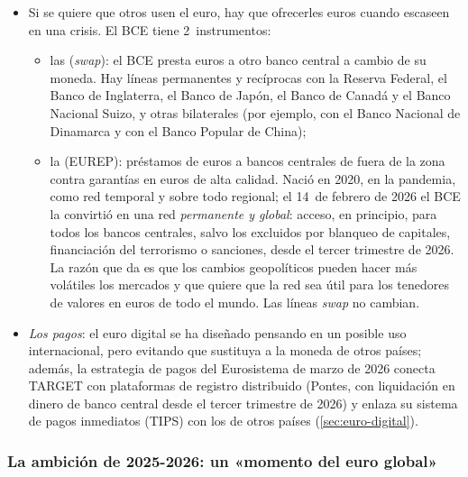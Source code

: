 \documentclass[11pt]{article}
\begin{document}
\begin{itemize}
\item Si se quiere que otros usen el euro, hay que ofrecerles euros cuando escaseen en una crisis. El BCE tiene 2~instrumentos\nocite{BCE2026LineasLiquidez}:
  \begin{itemize}
  \item las  (\emph{swap}): el BCE presta euros a otro banco central a cambio de su moneda. Hay líneas permanentes y recíprocas con la Reserva Federal, el Banco de Inglaterra, el Banco de Japón, el Banco de Canadá y el Banco Nacional Suizo, y otras bilaterales (por ejemplo, con el Banco Nacional de Dinamarca y con el Banco Popular de China);
  \item la  (EUREP): préstamos de euros a bancos centrales de fuera de la zona contra garantías en euros de alta calidad. Nació en 2020, en la pandemia, como red temporal y sobre todo regional; el 14~de febrero de 2026 el BCE la convirtió en una red \emph{permanente y global}: acceso, en principio, para todos los bancos centrales, salvo los excluidos por blanqueo de capitales, financiación del terrorismo o sanciones, desde el tercer trimestre de 2026\nocite{BCE2026EUREP}. La razón que da es que los cambios geopolíticos pueden hacer más volátiles los mercados y que quiere que la red sea útil para los tenedores de valores en euros de todo el mundo. Las líneas \emph{swap} no cambian.
  \end{itemize}
\item \emph{Los pagos}: el euro digital se ha diseñado pensando en un posible uso internacional, pero evitando que sustituya a la moneda de otros países; además, la estrategia de pagos del Eurosistema de marzo de 2026 conecta TARGET con plataformas de registro distribuido (Pontes, con liquidación en dinero de banco central desde el tercer trimestre de 2026) y enlaza su sistema de pagos inmediatos (TIPS) con los de otros países\nocite{BCE2026PapelEuro} (\ref{sec:euro-digital}).
\end{itemize}

\subsubsection{La ambición de 2025-2026: un «momento del euro global»}\label{sec:internacional-ambicion}
\end{document}
